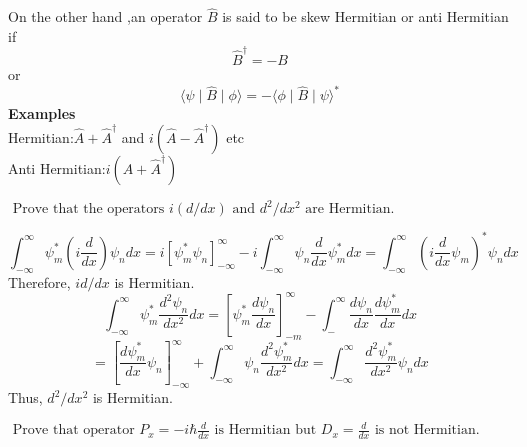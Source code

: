 On the other hand ,an operator $\hat{B}$ is said to be skew Hermitian or anti Hermitian if \\
$$ \hat{B}^{\dagger}=-B $$
or $$ \langle \psi \mid \hat{B} \mid \phi \rangle =-\langle \phi \mid \hat{B} \mid \psi\rangle ^*$$
\textbf{Examples}\\
Hermitian:$\hat{A}+\hat{A}^{\dagger}$ and $i(\hat{A}-\hat{A}^{\dagger})$ etc\\
Anti Hermitian:$i(\hat{A}+\hat{A}^{\dagger})$
\begin{exercise}
	$\text { Prove that the operators } i(d / d x) \text { and } d^{2} / d x^{2} \text { are Hermitian. }$
\end{exercise}
\begin{answer}
$$
\int_{-\infty}^{\infty} \psi_{m}^{*}\left(i \frac{d}{d x}\right) \psi_{n} d x=i\left[\psi_{m}^{*} \psi_{n}\right]_{-\infty}^{\infty}-i \int_{-\infty}^{\infty} \psi_{n} \frac{d}{d x} \psi_{m}^{*} d x=\int_{-\infty}^{\infty}\left(i \frac{d}{d x} \psi_{m}\right)^{*} \psi_{n} d x
$$
Therefore, $i d / d x$ is Hermitian.\\
$$\int_{-\infty}^{\infty} \psi_{m}^{*} \frac{d^{2} \psi_{n}}{d x^{2}} d x=\left[\psi_{m}^{*} \frac{d \psi_{n}}{d x}\right]_{-m}^{\infty}-\int_{-}^{\infty} \frac{d \psi_{n}}{d x} \frac{d \psi_{m}^{*}}{d x} d x$$
$$
=\left[\frac{d \psi_{m}^{*}}{d x} \psi_{n}\right]_{-\infty}^{\infty}+\int_{-\infty}^{\infty} \psi_{n} \frac{d^{2} \psi_{m}^{*}}{d x^{2}} d x=\int_{-\infty}^{\infty} \frac{d^{2} \psi_{m}^{*}}{d x^{2}} \psi_{n} d x
$$
Thus, $d^{2} / d x^{2}$ is Hermitian.	
\end{answer}
\begin{exercise}
$\text { Prove that operator } P_{x}=-i \hbar \frac{d}{d x} \text { is Hermitian but } D_{x}=\frac{d}{d x} \text { is not Hermitian. }$
\end{exercise}
